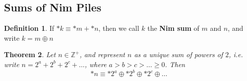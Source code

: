 \documentclass[11pt]{article}
\theoremstyle{plain}
\newtheorem{theorem}{Theorem}[section]
\theoremstyle{definition}
\newtheorem{definition}[theorem]{Definition}
\theoremstyle{remark}
\newcommand{\Z}{\mathbb{Z}}
\begin{document}
\subsection{Sums of Nim Piles}

\begin{definition}
    If \(*k \equiv *m + *n\), then we call \(k\) the \textbf{Nim sum} of \(m\) and \(n\), and write \(k = m \oplus n\)
\end{definition}

\begin{theorem}
    Let \(n \in \Z^+\), and represent \(n\) as a unique sum of powers of \(2\), i.e. write \(n = 2^{a} + 2^{b} + 2^{c} + \ldots  \), where \(a > b > c > \ldots \geq 0 \). Then 
    \[
        *n \equiv *2^{a} \oplus *2^{b} \oplus *2^{c} \oplus \ldots
    \]
\end{theorem}
\end{document}
